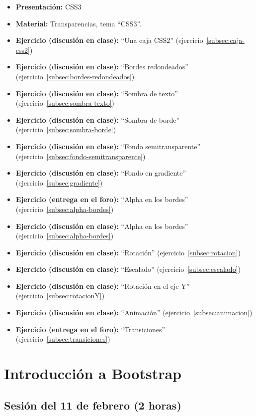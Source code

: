 \documentclass[a4paper,12pt]{report}
\begin{document}
\begin{itemize}
\item \textbf{Presentación:} CSS3
\item \textbf{Material:} Transparencias, tema ``CSS3''.
\item \textbf{Ejercicio (discusión en clase):} ``Una caja CSS2'' (ejercicio~\ref{subsec:caja-css2})
\item \textbf{Ejercicio (discusión en clase):} ``Bordes redondeados'' (ejercicio~\ref{subsec:bordes-redondeados})
\item \textbf{Ejercicio (discusión en clase):} ``Sombra de texto'' (ejercicio~\ref{subsec:sombra-texto})
\item \textbf{Ejercicio (discusión en clase):} ``Sombra de borde'' (ejercicio~\ref{subsec:sombra-borde})
\item \textbf{Ejercicio (discusión en clase):} ``Fondo semitransparente'' (ejercicio~\ref{subsec:fondo-semitransparente})
\item \textbf{Ejercicio (discusión en clase):} ``Fondo en gradiente'' (ejercicio~\ref{subsec:gradiente})
\item \textbf{Ejercicio (entrega en el foro):} ``Alpha en los bordes'' (ejercicio~\ref{subsec:alpha-bordes})
\item \textbf{Ejercicio (discusión en clase):} ``Alpha en los bordes'' (ejercicio~\ref{subsec:alpha-bordes})
\item \textbf{Ejercicio (discusión en clase):} ``Rotación'' (ejercicio~\ref{subsec:rotacion})
\item \textbf{Ejercicio (discusión en clase):} ``Escalado'' (ejercicio~\ref{subsec:escalado})
\item \textbf{Ejercicio (discusión en clase):} ``Rotación en el eje Y'' (ejercicio~\ref{subsec:rotacionY})
\item \textbf{Ejercicio (discusión en clase):} ``Animación'' (ejercicio~\ref{subsec:animacion})
\item \textbf{Ejercicio (entrega en el foro):} ``Transiciones'' (ejercicio~\ref{subsec:transiciones})
\end{itemize}

\section{Introducción a Bootstrap}

\subsection{Sesión del 11 de febrero (2 horas)}
\end{document}
